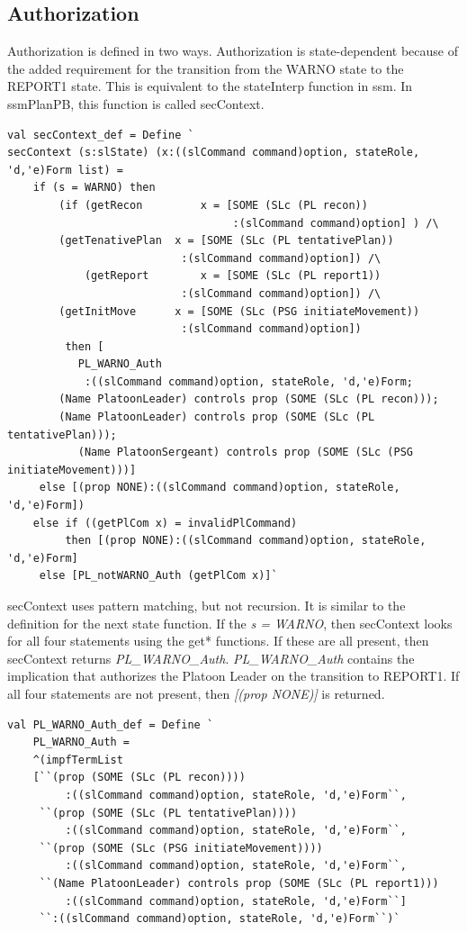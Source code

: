 \documentclass[../../main/main.tex]{subfiles}
\begin{document}
\subsection{Authorization}
Authorization is defined in two ways.  Authorization is state-dependent because of the added requirement for the transition from the WARNO state to the REPORT1 state.  This is equivalent to the stateInterp function in ssm.  In ssmPlanPB, this function is called secContext.

\begin{lstlisting}
val secContext_def = Define `
secContext (s:slState) (x:((slCommand command)option, stateRole, 'd,'e)Form list) =
    if (s = WARNO) then
        (if (getRecon         x = [SOME (SLc (PL recon))
                                   :(slCommand command)option] ) /\
	    (getTenativePlan  x = [SOME (SLc (PL tentativePlan))
	    		      	   :(slCommand command)option]) /\
            (getReport        x = [SOME (SLc (PL report1))
	    		      	   :(slCommand command)option]) /\
	    (getInitMove      x = [SOME (SLc (PSG initiateMovement))
	    		      	   :(slCommand command)option])
         then [
	       PL_WARNO_Auth
	        :((slCommand command)option, stateRole, 'd,'e)Form;
		(Name PlatoonLeader) controls prop (SOME (SLc (PL recon)));
		(Name PlatoonLeader) controls prop (SOME (SLc (PL tentativePlan)));
	       (Name PlatoonSergeant) controls prop (SOME (SLc (PSG initiateMovement)))]
	 else [(prop NONE):((slCommand command)option, stateRole, 'd,'e)Form])
    else if ((getPlCom x) = invalidPlCommand)
    	 then [(prop NONE):((slCommand command)option, stateRole, 'd,'e)Form]
	 else [PL_notWARNO_Auth (getPlCom x)]`
\end{lstlisting}

secContext uses pattern matching, but not recursion. It is similar to the definition for the next state function.  If the \textit{s = WARNO}, then secContext looks for all four statements using the get* functions.   If these are all present, then secContext returns \textit{PL_WARNO_Auth}. \textit{PL_WARNO_Auth} contains the implication that authorizes the Platoon Leader on the transition to REPORT1.  If all four statements are not present, then \textit{ [(prop NONE)]} is returned.


\begin{lstlisting}
val PL_WARNO_Auth_def = Define `
    PL_WARNO_Auth =
    ^(impfTermList
    [``(prop (SOME (SLc (PL recon))))
         :((slCommand command)option, stateRole, 'd,'e)Form``,
     ``(prop (SOME (SLc (PL tentativePlan))))
         :((slCommand command)option, stateRole, 'd,'e)Form``,
     ``(prop (SOME (SLc (PSG initiateMovement))))
         :((slCommand command)option, stateRole, 'd,'e)Form``,
     ``(Name PlatoonLeader) controls prop (SOME (SLc (PL report1)))
         :((slCommand command)option, stateRole, 'd,'e)Form``]
     ``:((slCommand command)option, stateRole, 'd,'e)Form``)`
\end{lstlisting}
\end{document}
